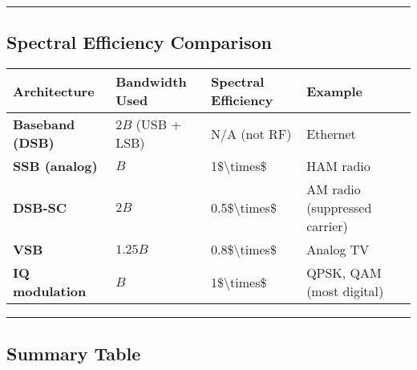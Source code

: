 \begin{center}\rule{0.5\linewidth}{0.5pt}\end{center}

\subsection{Spectral Efficiency
Comparison}\label{spectral-efficiency-comparison}

{\def\LTcaptype{} %
\begin{longtable}[]{@{}llll@{}}
\toprule\noalign{}
Architecture & Bandwidth Used & Spectral Efficiency & Example \\
\midrule\noalign{}
\endhead
\bottomrule\noalign{}
\endlastfoot
\textbf{Baseband (DSB)} & \(2B\) (USB + LSB) & N/A (not RF) &
Ethernet \\
\textbf{SSB (analog)} & \(B\) & 1\$\textbackslash times\$ & HAM radio \\
\textbf{DSB-SC} & \(2B\) & 0.5\$\textbackslash times\$ & AM radio
(suppressed carrier) \\
\textbf{VSB} & \(1.25B\) & 0.8\$\textbackslash times\$ & Analog TV \\
\textbf{IQ modulation} & \(B\) & 1\$\textbackslash times\$ & QPSK, QAM
(most digital) \\
\end{longtable}
}

\begin{center}\rule{0.5\linewidth}{0.5pt}\end{center}

\subsection{Summary Table}\label{summary-table}

